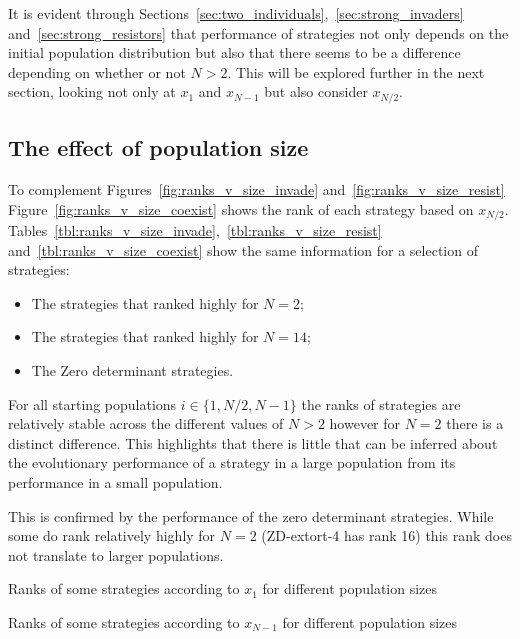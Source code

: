 \documentclass{article}
\begin{document}
It is evident through
Sections~\ref{sec:two_individuals},~\ref{sec:strong_invaders}
and~\ref{sec:strong_resistors} that performance of strategies not only depends
on the initial population distribution but also that there seems to be a
difference depending on whether or not \(N>2\). This will be explored further in
the next section, looking not only at \(x_1\) and \(x_{N-1}\) but also consider
\(x_{N/2}\).

\subsection{The effect of population size}\label{sec:population_size}

To complement Figures~\ref{fig:ranks_v_size_invade}
and~\ref{fig:ranks_v_size_resist} Figure~\ref{fig:ranks_v_size_coexist} shows
the rank of each strategy based on \(x_{N/2}\).
Tables~\ref{tbl:ranks_v_size_invade},~\ref{tbl:ranks_v_size_resist}
and~\ref{tbl:ranks_v_size_coexist} show the same information for a selection of
strategies:

\begin{itemize}
    \item The strategies that ranked highly for \(N=2\);
    \item The strategies that ranked highly for \(N=14\);
    \item The Zero determinant strategies.
\end{itemize}

For all starting populations
\(i\in\{1, N/2, N-1\}\) the ranks of strategies are relatively stable across the
different values of \(N>2\) however for \(N=2\) there is a distinct difference.
This highlights that there is little that can be inferred about the evolutionary
performance of a strategy in a large population from its performance in a small
population.

This is confirmed by the performance of the zero determinant strategies. While
some do rank relatively highly for \(N=2\) (ZD-extort-4 has rank 16) this rank
does not translate to larger populations.

\begin{table}[!hbtp]
    \centering
    \scriptsize
    
    \caption{Ranks of some strategies according to \(x_1\) for different
    population sizes}
    \label{tbl:ranks_v_size_invade}
\end{table}

\begin{table}[!hbtp]
    \centering
    \scriptsize
    
    \caption{Ranks of some strategies according to \(x_{N-1}\) for different
    population sizes}
    \label{tbl:ranks_v_size_resist}
\end{table}
\end{document}
